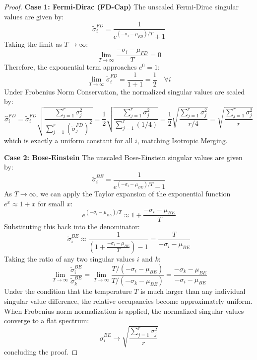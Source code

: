 \documentclass{article}
\theoremstyle{plain}
\theoremstyle{definition}
\theoremstyle{remark}
\begin{document}
\begin{proof}
\textbf{Case 1: Fermi-Dirac (FD-Cap)}
The unscaled Fermi-Dirac singular values are given by:
\begin{equation}
    \tilde{\sigma}_i^{FD} = \frac{1}{e^{(-\sigma_i - \mu_{FD})/T} + 1}
\end{equation}
Taking the limit as $T \to \infty$:
\begin{equation}
    \lim_{T \to \infty} \frac{-\sigma_i - \mu_{FD}}{T} = 0
\end{equation}
Therefore, the exponential term approaches $e^0 = 1$:
\begin{equation}
    \lim_{T \to \infty} \tilde{\sigma}_i^{FD} = \frac{1}{1 + 1} = \frac{1}{2} \quad \forall i
\end{equation}
Under Frobenius Norm Conservation, the normalized singular values are scaled by:
\begin{equation}
    \hat{\sigma}_i^{FD} = \tilde{\sigma}_i^{FD} \sqrt{\frac{\sum_{j=1}^r \sigma_j^2}{\sum_{j=1}^r (\tilde{\sigma}_j^{FD})^2}} = \frac{1}{2} \sqrt{\frac{\sum_{j=1}^r \sigma_j^2}{\sum_{j=1}^r (1/4)}} = \frac{1}{2} \sqrt{\frac{\sum_{j=1}^r \sigma_j^2}{r / 4}} = \sqrt{\frac{\sum_{j=1}^r \sigma_j^2}{r}}
\end{equation}
which is exactly a uniform constant for all $i$, matching Isotropic Merging.

\textbf{Case 2: Bose-Einstein}
The unscaled Bose-Einstein singular values are given by:
\begin{equation}
    \tilde{\sigma}_i^{BE} = \frac{1}{e^{(-\sigma_i - \mu_{BE})/T} - 1}
\end{equation}
As $T \to \infty$, we can apply the Taylor expansion of the exponential function $e^x \approx 1 + x$ for small $x$:
\begin{equation}
    e^{(-\sigma_i - \mu_{BE})/T} \approx 1 + \frac{-\sigma_i - \mu_{BE}}{T}
\end{equation}
Substituting this back into the denominator:
\begin{equation}
    \tilde{\sigma}_i^{BE} \approx \frac{1}{\left(1 + \frac{-\sigma_i - \mu_{BE}}{T}\right) - 1} = \frac{T}{-\sigma_i - \mu_{BE}}
\end{equation}
Taking the ratio of any two singular values $i$ and $k$:
\begin{equation}
    \lim_{T \to \infty} \frac{\tilde{\sigma}_i^{BE}}{\tilde{\sigma}_k^{BE}} = \lim_{T \to \infty} \frac{T / (-\sigma_i - \mu_{BE})}{T / (-\sigma_k - \mu_{BE})} = \frac{-\sigma_k - \mu_{BE}}{-\sigma_i - \mu_{BE}}
\end{equation}
Under the condition that the temperature $T$ is much larger than any individual singular value difference, the relative occupancies become approximately uniform. When Frobenius norm normalization is applied, the normalized singular values converge to a flat spectrum:
\begin{equation}
    \hat{\sigma}_i^{BE} \to \sqrt{\frac{\sum_{j=1}^r \sigma_j^2}{r}}
\end{equation}
concluding the proof.
\end{proof}
\end{document}
